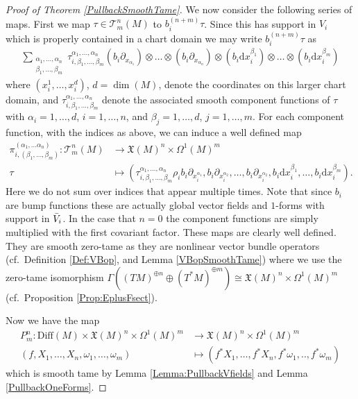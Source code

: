 \documentclass[12pt,a4paper]{article}
\theoremstyle{plain}
\theoremstyle{definition}
\newcommand{\tens}{\otimes}
\newcommand{\del}{\partial}
\newcommand{\om}{\omega}
\newcommand{\VFs}{\mathfrak{X}(M)}
\newcommand{\Forms}[1]{\Omega^{#1}(M)}
\newcommand{\Diff}{\mathrm{Diff}(M)}
\newcommand{\tensf}[2]{\mathcal{T}^{#1}_{#2}(M)}
\renewcommand{\d}{\mathrm{d}}
\begin{document}
\begin{proof}[Proof of Theorem \ref{PullbackSmoothTame}]
We now consider the following series of maps. First we map $\tau \in \tensf{n}{m}$ to $b_i^{(n+m)} \tau$. Since this has support in $V_i$ which is properly contained in a chart domain we may write $b_i^{(n+m)}\tau$ as
\begin{align*}
    \sum_{\substack{\alpha_1,\ldots,\alpha_n\\\beta_1,\ldots,\beta_m}}\tau^{\alpha_1,\ldots,\alpha_n}_{i,\beta_1,\ldots,\beta_m}(b_i\del_{x_{\alpha_1}})\tens\ldots\tens (b_i\del_{x_{\alpha_n}})\tens (b_i\d x_i^{\beta_1}) \tens \ldots \tens (b_i\d x_i^{\beta_m})
\end{align*}
where $(x_i^1,\ldots,x_i^d)$, $d=\dim(M)$, denote the coordinates on this larger chart domain, and $\tau^{\alpha_1,\ldots,\alpha_n}_{i,\beta_1,\ldots,\beta_m}$ denote the associated smooth component functions of $\tau$ with $\alpha_i=1,\ldots,d$, $i=1,\ldots,n$, and $\beta_j=1,\ldots,d$, $j=1,\ldots,m$.
For each component function, with the indices as above, we can induce a well defined map
\begin{align*}
    \pi^{(\alpha_1,\ldots\alpha_n)}_{i,(\beta_1,\ldots,\beta_m)}:\tensf{n}{m}&\longrightarrow \VFs^n\times \Forms{1}^m \\
    \tau &\longmapsto(\tau^{\alpha_1,\ldots,\alpha_n}_{i,\beta_1,\ldots,\beta_m}\rho_ib_i \del_{x_i^{\alpha_1}},b_i\del_{x_i^{\alpha_2}},\ldots,b_i\del_{x_i^{\alpha_2}},b_i \d x_i^{\beta_1},\ldots,b_i \d x_i^{\beta_m}).
\end{align*}
Here we do not sum over indices that appear multiple times. Note that since $b_i$ are bump functions these are actually global vector fields and $1$-forms with support in $\Bar{V}_i$. In the case that $n=0$ the component functions are simply multiplied with the first covariant factor.
These maps are clearly well defined. They are smooth zero-tame as they are nonlinear vector bundle operators (cf.~Definition \ref{Def:VBop}, and Lemma \ref{VBopSmoothTame}) where we use the zero-tame isomorphism $\Gamma((TM)^{\oplus n}\oplus (T^*M)^{\oplus m})\cong \VFs^n\times \Forms{1}^m$ (cf.~Proposition \ref{Prop:EplusFsect}).


Now we have the map 
\begin{align*}
    P_m^n:\Diff\times \VFs^n\times \Forms{1}^m &\longrightarrow \VFs^n\times \Forms{1}^m\\
    (f,X_1,\ldots,X_n,\om_1,\ldots,\om_m)&\longmapsto (f^*X_1,\ldots,f^*X_n,f^*\om_1,..,f^*\om_m)
\end{align*}
which is smooth tame by Lemma \ref{Lemma:PullbackVfields} and Lemma \ref{PullbackOneForms}. 


\end{proof}
\end{document}
